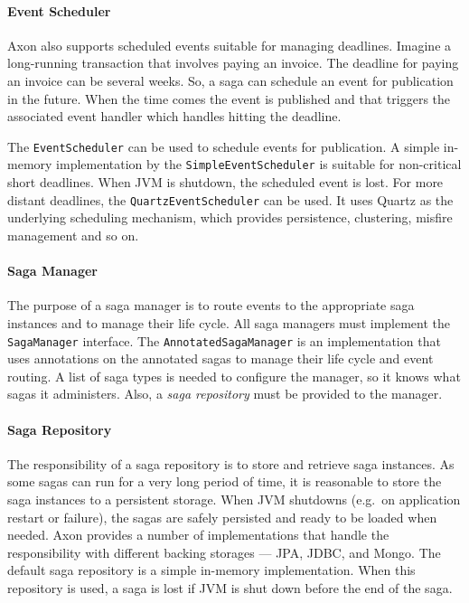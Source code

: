 \documentclass{book}
\begin{document}
\paragraph{Event Scheduler}\label{event-scheduler}

Axon also supports scheduled events suitable for managing deadlines.
Imagine a long-running transaction that involves paying an invoice. The
deadline for paying an invoice can be several weeks. So, a saga can
schedule an event for publication in the future. When the time comes the
event is published and that triggers the associated event handler which
handles hitting the deadline.

The \texttt{EventScheduler} can be used to schedule events for
publication. A simple in-memory implementation by the
\texttt{SimpleEventScheduler} is suitable for non-critical short
deadlines. When JVM is shutdown, the scheduled event is lost. For more
distant deadlines, the \texttt{QuartzEventScheduler} can be used. It
uses Quartz as the underlying scheduling mechanism, which provides
persistence, clustering, misfire management and so on.

\paragraph{Saga Manager}\label{saga-manager}

The purpose of a saga manager is to route events to the appropriate saga
instances and to manage their life cycle. All saga managers must
implement the \texttt{SagaManager} interface. The
\texttt{AnnotatedSagaManager} is an implementation that uses annotations
on the annotated sagas to manage their life cycle and event routing. A
list of saga types is needed to configure the manager, so it knows what
sagas it administers. Also, a \emph{saga repository} must be provided to the
manager.

\paragraph{Saga Repository}\label{saga-repository}

The responsibility of a saga repository is to store and retrieve saga
instances. As some sagas can run for a very long period of time, it is
reasonable to store the saga instances to a persistent storage. When JVM
shutdowns (e.g.~on application restart or failure), the sagas are safely
persisted and ready to be loaded when needed. Axon provides a number of
implementations that handle the responsibility with different backing
storages --- JPA, JDBC, and Mongo. The default saga repository is a
simple in-memory implementation. When this repository is used, a saga is
lost if JVM is shut down before the end of the saga.
\end{document}
